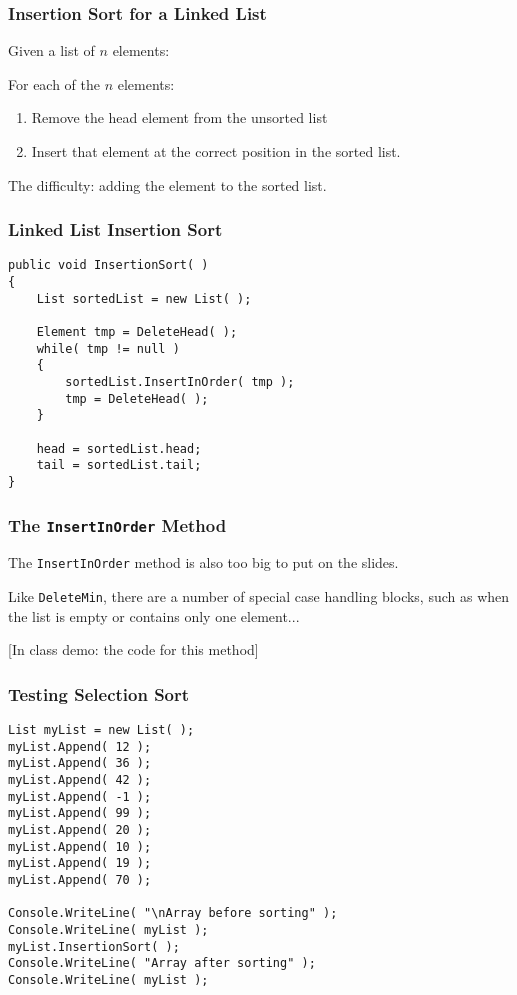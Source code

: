 \begin{frame}
\frametitle{Insertion Sort for a Linked List}

Given a list of $n$ elements:

For each of the $n$ elements:
\begin{enumerate}
	\item Remove the head element from the unsorted list
	\item Insert that element at the correct position in the sorted list.
\end{enumerate}

The difficulty: adding the element to the sorted list.

\end{frame}

\begin{frame}[fragile]
\frametitle{Linked List Insertion Sort}

\begin{verbatim}
public void InsertionSort( )
{
    List sortedList = new List( );

    Element tmp = DeleteHead( );
    while( tmp != null )
    {
        sortedList.InsertInOrder( tmp );
        tmp = DeleteHead( );
    }

    head = sortedList.head;
    tail = sortedList.tail;
}
\end{verbatim}

\end{frame}


\begin{frame}[fragile]
\frametitle{The \texttt{InsertInOrder} Method}
The \texttt{InsertInOrder} method is also too big to put on the slides.

Like \texttt{DeleteMin}, there are a number of special case handling blocks, such as when the list is empty or contains only one element...

[In class demo: the code for this method]

\end{frame}

\begin{frame}[fragile]
\frametitle{Testing Selection Sort}

\begin{verbatim}
List myList = new List( );
myList.Append( 12 );
myList.Append( 36 );
myList.Append( 42 );
myList.Append( -1 );
myList.Append( 99 );
myList.Append( 20 );
myList.Append( 10 );
myList.Append( 19 );
myList.Append( 70 );

Console.WriteLine( "\nArray before sorting" );
Console.WriteLine( myList );
myList.InsertionSort( );
Console.WriteLine( "Array after sorting" );
Console.WriteLine( myList );
\end{verbatim}

\end{frame}


